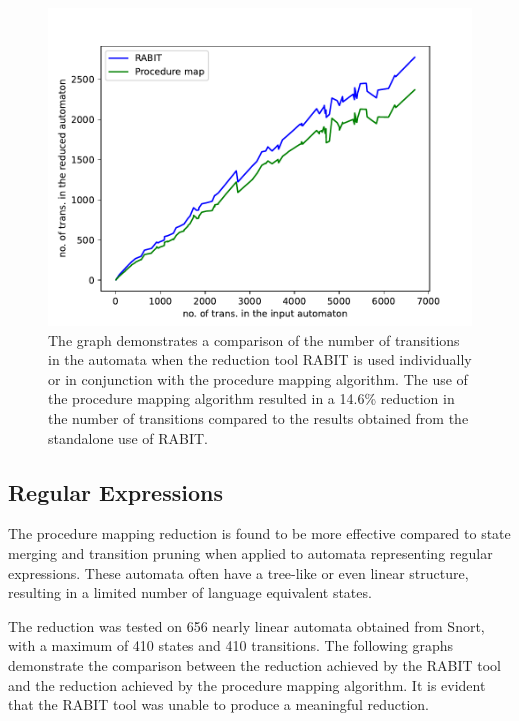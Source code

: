         \begin{figure}[!h]
            \centering
            \captionsetup{justification=justified}
            \includegraphics[width=1\linewidth]{images/armc-trans.pdf}
            \caption{The graph demonstrates a comparison of the number of transitions in the automata when the reduction tool RABIT is used individually or in conjunction with the procedure mapping algorithm. The use of the procedure mapping algorithm resulted in a 14.6\% reduction in the number of transitions compared to the results obtained from the standalone use of RABIT.}
        \end{figure}

    \subsection{Regular Expressions}
        The procedure mapping reduction is found to be more effective compared to state merging and transition pruning when applied to automata representing regular expressions. These automata often have a tree-like or even linear structure, resulting in a limited number of language equivalent states.

        The reduction was tested on 656 nearly linear automata obtained from Snort, with a maximum of 410 states and 410 transitions. The following graphs demonstrate the comparison between the reduction achieved by the RABIT tool and the reduction achieved by the procedure mapping algorithm. It is evident that the RABIT tool was unable to produce a meaningful reduction.


